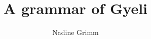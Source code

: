 \author{Nadine Grimm}
\title{A grammar of Gyeli}
\subtitle{}
\renewcommand{\lsSeries}{sidl}
\renewcommand{\lsSeriesNumber}{}

